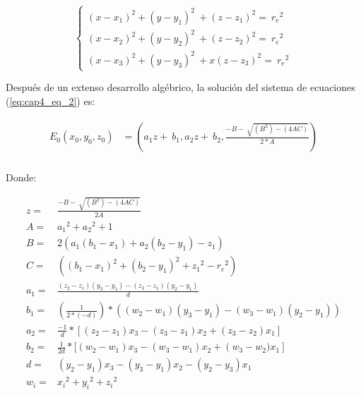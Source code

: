     
    \begin{equation}
    \left\lbrace
    \begin{array}{ll}
    {\left(x-x_1\right)}^2+{\left(y-y_1\right)}^2\ +{\left(z-z_1\right)}^2=\ {r_e}^2\  \\ 
    {\left(x-x_2\right)}^2+{\left(y-y_2\right)}^2\ +{\left(z-z_2\right)}^2=\ {r_e}^2 \\ 
    {\left(x-x_3\right)}^2+{\left(y-y_3\right)}^2\ +{x\left(z-z_3\right)}^2=\ {r_e}^2
    \end{array}
    \right.
    \label{eq:cap4_eq_2}
    \end{equation}


    Despu\'{e}s de un extenso desarrollo alg\'{e}brico, la soluci\'{o}n del sistema de ecuaciones  (\ref{eq:cap4_eq_2}) es:

    \vspace{-2.5em}

    \begin{align}
    \begin{split}
            E_0\left(x_0,y_0,z_0\right)&={} \left(a_1z+\ b_1,a_2z+\ b_2,\frac{-B-\ \sqrt{\left(B^2\right)-\left(4AC\right)}}{2*A}\right)\\
    \end{split}
    \label{eq:cap4_eq_3}
    \end{align}
    

    Donde:
    \vspace{-1.0em}
        
    \begin{align}
        z={}& \frac{-B-\ \sqrt{\left(B^2\right)-\left(4AC\right)}}{2A}
        \label{eq:cap4_eq_4} \\
        A={}& {a_1}^2+{a_2}^2+1
        \label{eq:cap4_eq_5} \\
        B={}&  2\left(a_1(b_1-x_1)+a_2(b_2-y_1)-z_1\right)
        \label{eq:cap4_eq_6} \\
        C={}& ({(b_1-x_1)}^2+{(b_2-y_1)}^2+{z_1}^2- {r_e}^2) 
        \label{eq:cap4_eq_7} \\
        a_1={}& \frac{\left(z_2-z_1\right)\left(y_3-y_1\right)-\left(z_3-z_1\right)\left(y_2-y_1\right)}{d} 
        \label{eq:cap4_eq_8} \\
        b_1={}& \left(\frac{1}{2*(-d)}\right)*\left(\left(w_2 - w_1\right)\left(y_3-y_1\right)-\left(w_3 - w_1\right)\left(y_2-y_1\right)\right)
        \label{eq:cap4_eq_9} \\
        a_2={}& \frac{-1}{d}*\left[\left(z_2-z_1\right)x_3-(z_3-z_1)x_2+(z_3-z_2)x_1\right]
        \label{eq:cap4_eq_10} \\
        b_2={}& \frac{1}{2d}*[\left(w_2-w_1\right)x_3-\left(w_3-w_1\right)x_2+\left(w_3-w_2)x_1\right]
        \label{eq:cap4_eq_11} \\
        d={}& \left(y_2- y_1\right)x_3-\left(y_3-y_1\right)x_2- \left(y_2-y_3\right)x_1
        \label{eq:cap4_eq_12} \\
        w_i={}& {x_i}^2+{y_i}^2 +{z_i}^2
        \label{eq:cap4_eq_13} 
    \end{align}


